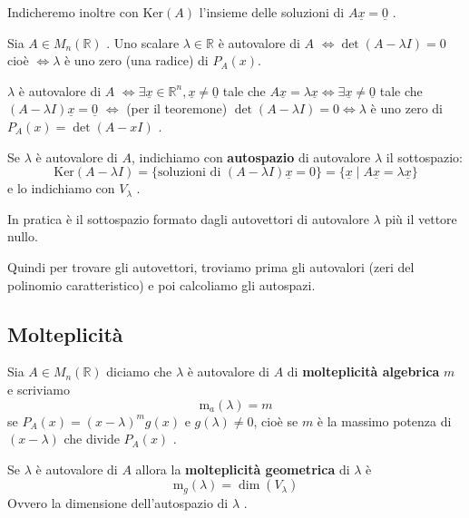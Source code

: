 \documentclass[
  a4paper,
]{article}
\begin{document}
Indicheremo inoltre con \(\text{Ker}(A)\) l'insieme delle soluzioni di
\(A\underline{x} = \underline{0}\) .

\begin{teoremabox}
Sia \(A \in M_n (\mathbb{R})\) . Uno scalare \(\lambda \in \mathbb{R}\)
è autovalore di \(A\) \(\iff \det(A - \lambda I) = 0\) cioè
\(\iff \lambda\) è uno zero (una radice) di \(P_A(x)\).
\end{teoremabox}

\begin{proofbox}
\(\lambda\) è autovalore di \(A\)
\(\iff \exists \underline{x} \in \mathbb{R}^n, \underline{x} \not = \underline{0}\)
tale che
\(A\underline{x} = \lambda \underline{x} \iff \exists \underline{x} \neq \underline{0}\)
tale che \((A- \lambda I)\underline{x} = \underline{0}\) \(\iff\) (per
il teoremone) \(\det(A -\lambda I) = 0 \iff \lambda\) è uno zero di
\(P_A(x) = \det(A - xI)\) .
\end{proofbox}

\begin{definitionbox}
Se \(\lambda\) è autovalore di \(A\), indichiamo con \textbf{autospazio}
di autovalore \(\lambda\) il sottospazio: \[
\text{Ker}(A -\lambda I) = \{\text{soluzioni di }(A -\lambda I)\underline{x} = 0\} = \{\underline{x} \mid A\underline{x} = \lambda\underline{x}\}
\] e lo indichiamo con \(V_{\lambda}\) .

In pratica è il sottospazio formato dagli autovettori di autovalore
\(\lambda\) più il vettore nullo.
\end{definitionbox}

Quindi per trovare gli autovettori, troviamo prima gli autovalori (zeri
del polinomio caratteristico) e poi calcoliamo gli autospazi.

\hypertarget{molteplicituxe0}{%
\subsection{Molteplicità}\label{molteplicituxe0}}

\begin{definitionbox}
Sia \(A \in M_n (\mathbb{R})\) diciamo che \(\lambda\) è autovalore di
\(A\) di \textbf{molteplicità algebrica} \(m\) e scriviamo \[
\text{m}_a(\lambda) = m
\] se \(P_A(x) = (x- \lambda)^m g(x)\) e \(g(\lambda) \not = 0\), cioè
se \(m\) è la massimo potenza di \((x - \lambda)\) che divide \(P_A(x)\)
.
\end{definitionbox}

\begin{definitionbox}
Se \(\lambda\) è autovalore di \(A\) allora la \textbf{molteplicità
geometrica} di \(\lambda\) è \[
\text{m}_g(\lambda) = \dim(V_\lambda)
\] Ovvero la dimensione dell'autospazio di \(\lambda\) .
\end{definitionbox}
\end{document}
